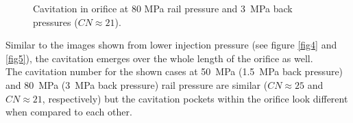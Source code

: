 \documentclass[letterpaper,twocolumn,10pt]{ilass}
\begin{document}
\begin{figure}[h]
\begin{center}
\end{center}
\vspace*{-2mm}
\caption{Cavitation in orifice at 80 MPa rail pressure and 3~MPa back pressures ($CN \approx 21$).}
\label{fig6} 
\end{figure}


Similar to the images shown from lower injection pressure (see figure \ref{fig4} and \ref{fig5}),
the cavitation emerges over the whole length of the orifice as well.\\
%
The cavitation number for the shown cases at 50~MPa (1.5~MPa back pressure) and 80~MPa
(3~MPa back pressure) rail pressure are similar ($CN \approx 25$ and $CN \approx 21$,
respectively) but the cavitation pockets within the orifice look different when compared
to each other.\\



\end{document}
